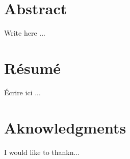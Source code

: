 \chapter*{Abstract}
Write here ...
\chapter*{Résumé}
Écrire ici ...
\chapter*{Aknowledgments}
I would like to thankn...

